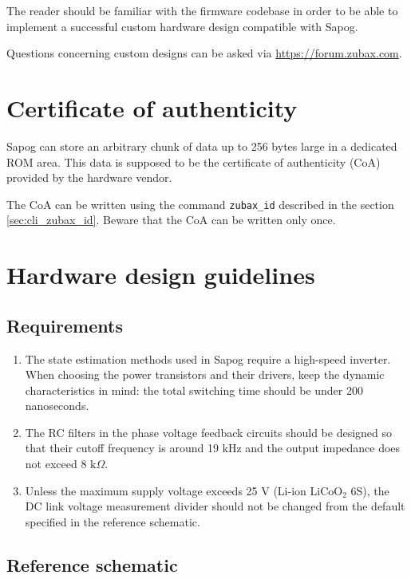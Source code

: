 \documentclass{zubaxdoc}
\begin{document}
	The reader should be familiar with the firmware codebase in order to be able to implement a successful
	custom hardware design compatible with Sapog.
	
	Questions concerning custom designs can be asked via \url{https://forum.zubax.com}.
	
	\section{Certificate of authenticity}
	
	Sapog can store an arbitrary chunk of data up to 256 bytes large in a dedicated ROM area.
	This data is supposed to be the certificate of authenticity (CoA) provided by the hardware vendor.
	
	The CoA can be written using the command \verb|zubax_id| described in the section
	\ref{sec:cli_zubax_id}.
	Beware that the CoA can be written only once.
	
	\section{Hardware design guidelines}
	
	\subsection{Requirements}
	
	\begin{enumerate}
		\item The state estimation methods used in Sapog require a high-speed inverter.
		When choosing the power transistors and their drivers, keep the dynamic characteristics in mind:
		the total switching time should be under 200 nanoseconds.
		
		\item The RC filters in the phase voltage feedback circuits should be designed so that their cutoff frequency
		is around 19 kHz and the output impedance does not exceed 8 $\text{k}\Omega$.
		
		\item Unless the maximum supply voltage exceeds 25 V (Li-ion $\text{LiCoO}_2$ 6S),
		the DC link voltage measurement divider should not be changed from the default specified in
		the reference schematic.
	\end{enumerate}
	
	\subsection{Reference schematic}
	
\end{document}
